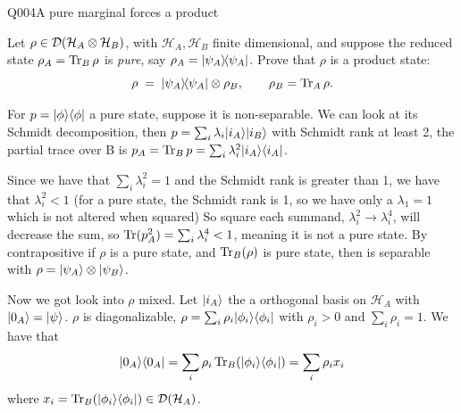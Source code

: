 \begin{entry}{Q004}{A pure marginal forces a product}


\begin{problem}
Let $\rho\in\mathcal{D}\!\left(\mathcal H_A\otimes\mathcal H_B\right)$, with $\mathcal H_A,\mathcal H_B$
finite dimensional, and suppose the reduced state $\rho_A=\operatorname{Tr}_B\rho$ is \emph{pure},
say $\rho_A=\lvert \psi_A \rangle\!\langle \psi_A \rvert$. Prove that $\rho$ is a product state:
\[
  \rho \;=\; \lvert \psi_A \rangle\!\langle \psi_A \rvert\otimes\rho_B,
  \qquad \rho_B=\operatorname{Tr}_A\rho .
\]
\end{problem}

\begin{solution}
For $p=\lvert \phi \rangle\langle \phi \rvert$ a pure state, suppose it is non-separable.
We can look at its Schmidt decomposition, then 
$p= \sum_i \lambda_i \lvert i_A \rangle\lvert i_B \rangle$ with Schmidt rank at least 2, the partial trace over B is 
$p_A = \operatorname{Tr}_B p = \sum_i \lambda_i^2 \lvert i_A \rangle\langle i_A \rvert$.

Since we have that $\sum_i \lambda_i^2 =1$ and the Schmidt rank is greater than 1, we have that $\lambda_i^2 < 1$  (for a pure state, the Schmidt rank is 1, so we have only a $\lambda_1=1$ which is not altered when squared)
So square each summand, $\lambda_i^2 \rightarrow \lambda_i^4$, will decrease the sum, so
$\operatorname{Tr}( p_A^2) = \sum_i \lambda_i^4 < 1$, meaning it is not a pure state.  
By contrapositive if $\rho$ is a pure state, and $\operatorname{Tr}_B(\rho)$ is  pure state, then is separable with $\rho =\lvert \psi_A \rangle\otimes\lvert \psi_B \rangle$.

Now we got look into $\rho$ mixed. Let $\lvert i_A \rangle$ the a orthogonal basis on $\mathcal{H}_A$ with $\lvert 0_A \rangle=\lvert \psi \rangle$. 
$\rho$ is diagonalizable, $\rho=\sum_i \rho_i \lvert \phi_i \rangle\langle \phi_i \rvert$ with $\rho_i>0$ and $\sum_i \rho_i=1$.
We have that
\begin{equation}
    \lvert 0_A \rangle\langle 0_A \rvert=\sum_i \rho_i \operatorname{Tr}_B(\lvert \phi_i \rangle\langle \phi_i \rvert)=\sum_i \rho_i x_i
    \label{check}
\end{equation}
where $x_i=\operatorname{Tr}_B(\lvert \phi_i \rangle\langle \phi_i \rvert) \in \mathcal{D}\!\left(\mathcal H_A\right)$.


\end{solution}
\end{entry}
